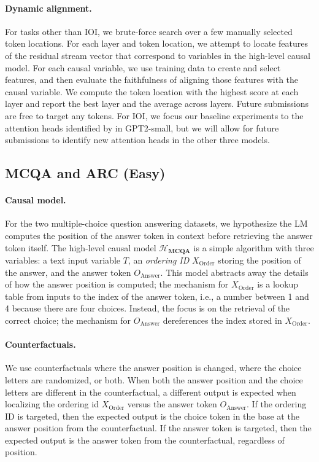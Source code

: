 \documentclass{article}
\theoremstyle{plain}
\theoremstyle{definition}
\theoremstyle{remark}
\newcommand{\order}{X_{\text{Order}}}
\newcommand{\answer}{O_{\text{Answer}}}
\newcommand{\inputvar}{T}
\begin{document}
\paragraph{Dynamic alignment.} For tasks other than IOI, we brute-force search over a few manually selected token locations. For each layer and token location, we attempt to locate features of the residual stream vector that correspond to variables in the high-level causal model. For each causal variable, we use training data to create and select features, and then evaluate the faithfulness of aligning those features with the causal variable. We compute the token location with the highest score at each layer and report the best layer and the average across layers.  Future submissions are free to target any tokens. For IOI, we focus our baseline experiments to the attention heads identified by \citet{wang2022interpretability} in GPT2-small, but we will allow for future submissions to identify new attention heads in the other three models.

\subsection{MCQA and ARC (Easy)}
\paragraph{Causal model.} For the two multiple-choice question answering datasets, we hypothesize the LM computes the position of the answer token in context before retrieving the answer token itself. The high-level causal model $\mathcal{H}_{\mathbf{MCQA}}$ is a simple algorithm with three variables: a text input variable $\inputvar$, an \textit{ordering ID} $\order$ \cite{dai-etal-2024-representational} storing the position of the answer, and the answer token $\answer$. This model abstracts away the details of how the answer position is computed; the mechanism for $\order$ is a lookup table from inputs to the index of the answer token, i.e., a number between 1 and 4 because there are four choices. Instead, the focus is on the retrieval of the correct choice; the mechanism for $\answer$ dereferences the index stored in $\order$.

\paragraph{Counterfactuals.} We use counterfactuals where the answer position is changed, where the choice letters are randomized, or both. 
When both the answer position and the choice letters are different in the counterfactual, a different output is expected when localizing the ordering id $\order$ versus the answer token $\answer$. 
If the ordering ID is targeted, then the expected output is the choice token in the base at the answer position from the counterfactual.
If the answer token is targeted, then the expected output is the answer token from the counterfactual, regardless of position.
\end{document}
